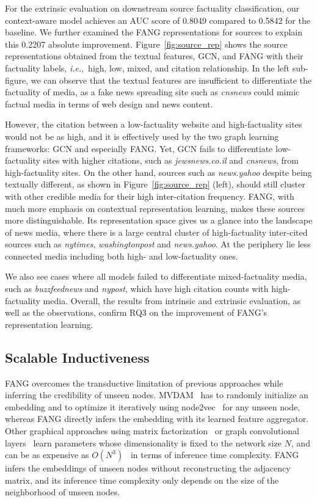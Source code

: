 \documentclass[sigconf]{acmart}
\theoremstyle{definition}
\theoremstyle{hypothesis}
\begin{document}
For the extrinsic evaluation on downstream source factuality classification, our context-aware model achieves an AUC score of 0.8049 compared to 0.5842 for the baseline. We further examined the FANG representations for sources to explain this 0.2207 absolute improvement. Figure~\ref{fig:source_rep} shows the source representations obtained from the textual features, GCN, and FANG with their factuality labels,  \textit{i.e.},~high, low, mixed, and citation relationship. In the left sub-figure, we can observe that the textual features are insufficient to differentiate the factuality of media, as a fake news spreading site such as \textit{cnsnews}
could mimic factual media in terms of web design and news content.

However, the citation between a low-factuality website and high-factuality sites would not be as high, and it is effectively used by the two graph learning frameworks: GCN and especially FANG. 
Yet, GCN fails to differentiate low-factuality sites with higher citations, such as \textit{jewsnews.co.il} and \textit{cnsnews}, from high-factuality sites. On the other hand, sources such as \textit{news.yahoo}
despite being textually different, as shown in Figure~\ref{fig:source_rep} (left), should still cluster with other credible media for their high inter-citation frequency. FANG, with much more emphasis on contextual representation learning, makes these sources more distinguishable. Its representation space gives us a glance into the landscape of news media, where there is a large central cluster of high-factuality inter-cited sources such as \textit{nytimes},
\textit{washingtonpost}
and \textit{news.yahoo}. At the periphery lie less connected media including both high- and low-factuality ones.

We also see cases where all models failed to differentiate mixed-factuality media, such as \textit{buzzfeednews} and
\textit{nypost},
which have high citation counts with high-factuality media.
Overall, the results from intrinsic and extrinsic evaluation, as well as the observations, confirm RQ3 on the improvement of FANG's representation learning.

\subsection{Scalable Inductiveness}
FANG overcomes the transductive limitation of previous approaches while inferring the credibility of unseen nodes. MVDAM~\cite{kulkarni2018multi} has to randomly initialize an embedding and to optimize it iteratively using node2vec~\cite{grover2016node2vec} for any unseen node, whereas FANG directly infers the embedding with its learned feature aggregator. Other graphical approaches using matrix factorization~\cite{shu2019beyond} or graph convolutional layers~\cite{monti2019fake,ming2019multiple} learn parameters whose dimensionality is fixed to the network size $N$, and can be as expensive as $O(N^3)$~\cite{ming2019multiple} in terms of inference time complexity. FANG infers the embeddings of unseen nodes without reconstructing the adjacency matrix, and its inference time complexity only depends on the size of the neighborhood of unseen nodes.
\end{document}
